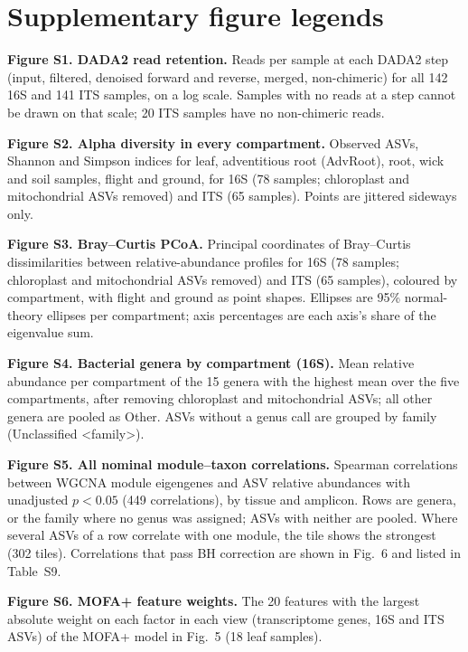 \documentclass[pdflatex,sn-nature]{sn-jnl}
\begin{document}
\section*{Supplementary figure legends}

\noindent\textbf{Figure S1. DADA2 read retention.} Reads per sample at each DADA2 step (input, filtered, denoised forward and reverse, merged, non-chimeric) for all 142 16S and 141 ITS samples, on a log scale. Samples with no reads at a step cannot be drawn on that scale; 20 ITS samples have no non-chimeric reads.

\noindent\textbf{Figure S2. Alpha diversity in every compartment.} Observed ASVs, Shannon and Simpson indices for leaf, adventitious root (AdvRoot), root, wick and soil samples, flight and ground, for 16S (78 samples; chloroplast and mitochondrial ASVs removed) and ITS (65 samples). Points are jittered sideways only.

\noindent\textbf{Figure S3. Bray--Curtis PCoA.} Principal coordinates of Bray--Curtis dissimilarities between relative-abundance profiles for 16S (78 samples; chloroplast and mitochondrial ASVs removed) and ITS (65 samples), coloured by compartment, with flight and ground as point shapes. Ellipses are 95\% normal-theory ellipses per compartment; axis percentages are each axis's share of the eigenvalue sum.

\noindent\textbf{Figure S4. Bacterial genera by compartment (16S).} Mean relative abundance per compartment of the 15 genera with the highest mean over the five compartments, after removing chloroplast and mitochondrial ASVs; all other genera are pooled as Other. ASVs without a genus call are grouped by family (Unclassified \textless family\textgreater{}).

\noindent\textbf{Figure S5. All nominal module--taxon correlations.} Spearman correlations between WGCNA module eigengenes and ASV relative abundances with unadjusted \(p < 0.05\) (449 correlations), by tissue and amplicon. Rows are genera, or the family where no genus was assigned; ASVs with neither are pooled. Where several ASVs of a row correlate with one module, the tile shows the strongest (302 tiles). Correlations that pass BH correction are shown in Fig.~6 and listed in Table~S9.

\noindent\textbf{Figure S6. MOFA+ feature weights.} The 20 features with the largest absolute weight on each factor in each view (transcriptome genes, 16S and ITS ASVs) of the MOFA+ model in Fig.~5 (18 leaf samples).
\end{document}
